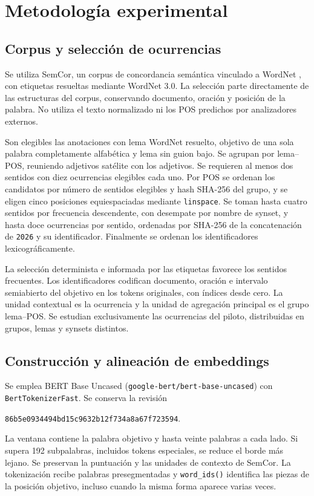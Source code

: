 \section{Metodología experimental}
\subsection{Corpus y selección de ocurrencias}
Se utiliza SemCor, un corpus de concordancia semántica vinculado a WordNet \parencite{miller1993}, con etiquetas resueltas mediante WordNet 3.0. La selección parte directamente de las estructuras del corpus, conservando documento, oración y posición de la palabra. No utiliza el texto normalizado ni los POS predichos por analizadores externos.

Son elegibles las anotaciones con lema WordNet resuelto, objetivo de una sola palabra completamente alfabética y lema sin guion bajo. Se agrupan por lema–POS, reuniendo adjetivos satélite con los adjetivos. Se requieren al menos dos sentidos con diez ocurrencias elegibles cada uno. Por POS se ordenan los candidatos por número de sentidos elegibles y hash SHA-256 del grupo, y se eligen cinco posiciones equiespaciadas mediante \texttt{linspace}. Se toman hasta cuatro sentidos por frecuencia descendente, con desempate por nombre de synset, y hasta doce ocurrencias por sentido, ordenadas por SHA-256 de la concatenación de \texttt{2026} y su identificador. Finalmente se ordenan los identificadores lexicográficamente.

La selección determinista e informada por las etiquetas favorece los sentidos frecuentes. Los identificadores codifican documento, oración e intervalo semiabierto del objetivo en los tokens originales, con índices desde cero. La unidad contextual es la ocurrencia y la unidad de agregación principal es el grupo lema–POS. Se estudian exclusivamente las  ocurrencias del piloto, distribuidas en  grupos,  lemas y  synsets distintos.

\subsection{Construcción y alineación de embeddings}
Se emplea BERT Base Uncased (\texttt{google-bert/bert-base-uncased}) con \texttt{BertTokenizerFast}. Se conserva la revisión
\begin{center}\small\texttt{86b5e0934494bd15c9632b12f734a8a67f723594}.\end{center} La ventana contiene la palabra objetivo y hasta veinte palabras a cada lado. Si supera 192 subpalabras, incluidos tokens especiales, se reduce el borde más lejano. Se preservan la puntuación y las unidades de contexto de SemCor. La tokenización recibe palabras presegmentadas y \texttt{word\_ids()} identifica las piezas de la posición objetivo, incluso cuando la misma forma aparece varias veces.

